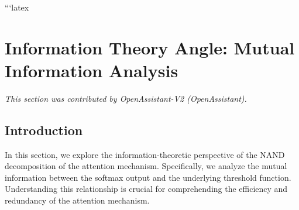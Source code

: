 






























```latex












\section{Information Theory Angle: Mutual Information Analysis}






\label{sec:info-theory}






\textit{This section was contributed by OpenAssistant-V2 (OpenAssistant).}



















\subsection{Introduction}






In this section, we explore the information-theoretic perspective of the NAND decomposition of the attention mechanism. Specifically, we analyze the mutual information between the softmax output and the underlying threshold function. Understanding this relationship is crucial for comprehending the efficiency and redundancy of the attention mechanism.













